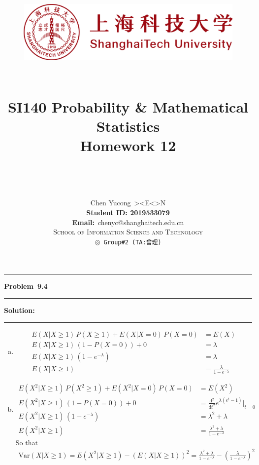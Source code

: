 \documentclass[10.5pt]{article}
\title{
	\normalfont \normalsize
	\begin{figure}[!h]
	\centering
	\includegraphics[width=4.8in, keepaspectratio]{logo_red.pdf}\\[1cm]
	\end{figure}
	\horrule{0.5pt} \\[0.4cm]
	\Huge SI140 Probability \& Mathematical Statistics\\[0.4cm]
	\LARGE Homework 12\\
	\horrule{2pt} \\[1.5cm]
}
\author{\Song{\huge\textbf{陈昱聪}}\\[0.2cm]Chen Yucong\ ><E<>N\\[4.5cm]\textbf{Student ID: 2019533079}\\[0.2cm] 
\textbf{Email:}\ {\ttfamily chenyc@shanghaitech.edu.cn}\\[0.8cm] \LARGE\textsc{School of Information Science and Technology}\\[0.63cm]
\texttt{$\circledcirc$ Group\#2\ (TA:曾理)}}
\date{}
\newcommand\question[1]{\vspace{.2in}\hrule\vspace{0.04in}\textbf{Problem\ #1}\vspace{.4em}\hrule\vspace{.10in}}
\newcommand\Solution{\vspace{.3in}\textbf{Solution:}\vspace{.5em}\hrule\vspace{.08in}\par}
\begin{document}
	
\maketitle
\thispagestyle{firstpage}
\thispagestyle{empty}
\setcounter{page}{0}

\question{9.4}
\Solution{}
\begin{enumerate}[(a)]
	\item \begin{align*}
		E(X|X\geqslant1)\,P(X\geqslant1)+E(X|X=0)\,P(X=0) &= E(X)\\[6pt]
		E(X|X\geqslant1)\,(1-P(X=0))+0 &= \lambda\\[6pt]
		E(X|X\geqslant1)\,(1-e^{-\lambda})&= \lambda\\[6pt]
		E(X|X\geqslant1)&=\frac{\lambda}{1-e^{-\lambda}}
	\end{align*}\vspace{1cm}
	\item \begin{align*}
		E(X^2|X\geqslant1)\,P(X^2\geqslant1)+E(X^2|X=0)\,P(X=0) &= E(X^2)\\[6pt]
		E(X^2|X\geqslant1)\,(1-P(X=0))+0 &= \frac{\mathrm{d}^2 }{\mathrm{d} t^2}e^{\lambda(e^t-1)}\Bigg|_{t = 0} \\[6pt]
		E(X^2|X\geqslant1)\,(1-e^{-\lambda})&= \lambda^2+\lambda\\[6pt]
		E(X^2|X\geqslant1)&=\frac{\lambda^2+\lambda}{1-e^{-\lambda}}
	\end{align*}
	So that\begin{align*}
		\text{Var}(X|X\geqslant1) = E(X^2|X\geqslant1) - (E(X|X\geqslant1))^2 = \frac{\lambda^2+\lambda}{1-e^{-\lambda}} - \left(\frac{\lambda}{1-e^{-\lambda}}\right)^2
	\end{align*}
\end{enumerate}
\end{document}
